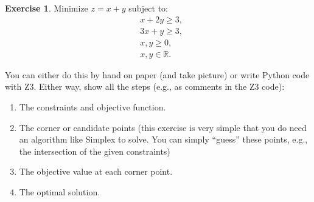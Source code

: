 \documentclass[oneside,11pt,dvipsnames]{book}
\numberwithin{equation}{section}
\theoremstyle{definition}
\newtheorem{exercise}{Exercise}[section]
\theoremstyle{remark}
\begin{document}
\begin{exercise}\label{exercise:milp-hand}
Minimize $z = x + y$ subject to:
\[
\begin{aligned}
& x + 2y \geq 3, \\
& 3x + y \geq 3, \\
& x, y \geq 0, \\
& x,y \in \mathbb{R}.
\end{aligned}
\]

You can either do this by hand on paper (and take picture) or write Python code with Z3. Either way, show all the steps (e.g., as comments in the Z3 code):
\begin{enumerate}
    \item The constraints and objective function.
    \item The corner or candidate points (this exercise is very simple that you do need an algorithm like Simplex to solve. You can simply ``guess'' these points, e.g., the intersection of the given constraints)
    \item The objective value at each corner point.
    \item The optimal solution.
\end{enumerate}
\end{exercise}





\end{document}
